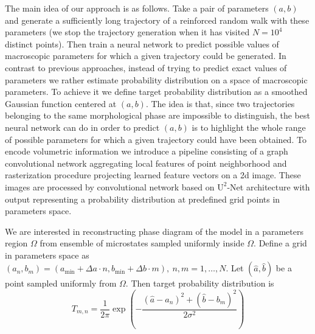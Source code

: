 \documentclass[aps,a4paper,twocolumn,showpacs]{revtex4}
\begin{document}
The main idea of our approach is as follows. Take a pair of parameters $(a,b)$ and generate a sufficiently long trajectory of a reinforced random walk with these parameters (we stop the trajectory generation when it has visited $N = 10^4$ distinct points). Then train a neural network to predict possible values of macroscopic parameters for which a given trajectory could be generated. In contrast to previous approaches, instead of trying to predict exact values of parameters we rather estimate probability distribution on a space of macroscopic parameters. To achieve it we define target probability distribution as a smoothed Gaussian function centered at $(a,b)$. The idea is that, since two trajectories belonging to the same morphological phase are impossible to distinguish, the best neural network can do in order to predict $(a,b)$ is to highlight the whole range of possible parameters for which a given trajectory could have been obtained. To encode volumetric information we introduce a pipeline consisting of a graph convolutional network aggregating local features of point neighborhood and rasterization procedure projecting learned feature vectors on a 2d image. These images are processed by convolutional network based on $\text{U}^{2}$-Net architecture with output representing a probability distribution at predefined grid points in parameters space.

We are interested in reconstructing phase diagram of the model in a parameters region $\Omega$ from ensemble of microstates sampled uniformly inside $\Omega$. Define a grid in parameters space as  
$(a_{n}, b_{m}) = (a_{\text{min}} + \Delta a \cdot n, b_{\text{min}} + \Delta b \cdot m), \ n, m = 1, \dots, N.$ Let $(\hat{a}, \hat{b})$ be a point sampled uniformly from $\Omega$. Then target probability distribution is 
$$
T_{m, n} = \frac{1}{2 \pi }\exp\left(-\frac{(\hat{a} - a_{n})^{2}+(\hat{b} - b_{m})^{2}}{2\sigma^{2}}\right)
$$
\end{document}
